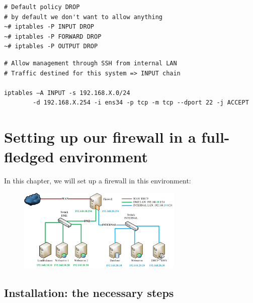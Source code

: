 \documentclass{article}
\begin{document}
\begin{verbatim}
# Default policy DROP
# by default we don't want to allow anything
~# iptables -P INPUT DROP
~# iptables -P FORWARD DROP
~# iptables -P OUTPUT DROP
\end{verbatim}

\begin{verbatim}
# Allow management through SSH from internal LAN
# Traffic destined for this system => INPUT chain

iptables –A INPUT -s 192.168.X.0/24 
        -d 192.168.X.254 -i ens34 -p tcp -m tcp --dport 22 -j ACCEPT
\end{verbatim}

\section{Setting up our firewall in a full-fledged environment}

In this chapter, we will set up a firewall in this environment:

\begin{figure}[H]
    \centering
    \includegraphics[width=0.7\textwidth]{full-fledged-environment.jpg}
\end{figure}

\subsection{Installation: the necessary steps}
\end{document}
